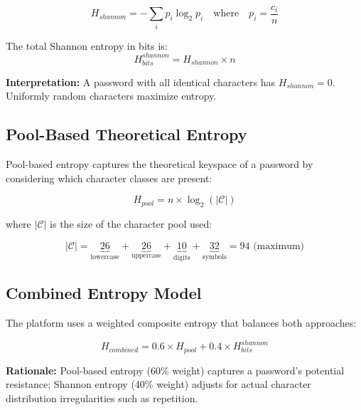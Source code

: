 \documentclass[12pt,a4paper]{article}
\begin{document}
\begin{equation}
H_{shannon} = -\sum_{i} p_i \log_2 p_i
\quad \text{where} \quad
p_i = \frac{c_i}{n}
\label{eq:shannon}
\end{equation}

The total Shannon entropy in bits is:
\begin{equation}
H_{bits}^{shannon} = H_{shannon} \times n
\label{eq:shannon_total}
\end{equation}

\textbf{Interpretation:} A password with all identical characters has
$H_{shannon} = 0$. Uniformly random characters maximize entropy.

\subsection{Pool-Based Theoretical Entropy}

Pool-based entropy captures the theoretical keyspace of a password by
considering which character classes are present:

\begin{equation}
H_{pool} = n \times \log_2(|\mathcal{C}|)
\label{eq:pool}
\end{equation}

where $|\mathcal{C}|$ is the size of the character pool used:

\begin{equation}
|\mathcal{C}| = \underbrace{26}_{\text{lowercase}} +
                \underbrace{26}_{\text{uppercase}} +
                \underbrace{10}_{\text{digits}} +
                \underbrace{32}_{\text{symbols}}
              = 94 \text{ (maximum)}
\label{eq:pool_size}
\end{equation}

\subsection{Combined Entropy Model}

The platform uses a weighted composite entropy that balances both approaches:

\begin{equation}
H_{combined} = 0.6 \times H_{pool} + 0.4 \times H_{bits}^{shannon}
\label{eq:combined}
\end{equation}

\textbf{Rationale:} Pool-based entropy (60\% weight) captures a password's
potential resistance; Shannon entropy (40\% weight) adjusts for actual
character distribution irregularities such as repetition.
\end{document}
